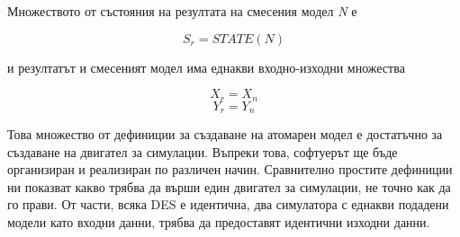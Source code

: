 		\noindent Множеството от състояния на резултата на смесения модел \emph{N} е
		
		\begin{equation}
			S_r = STATE(N)
		\end{equation}
		
		\noindent и резултатът и смесеният модел има еднакви входно-изходни множества
		
		\begin{equation}
			X_r = X_n
		\end{equation}		
		\begin{equation}
			Y_r = Y_n
		\end{equation}
		
		Това множество от дефиниции за създаване на атомарен модел е достатъчно
		за създаване на двигател за симулации. Въпреки това, софтуерът ще бъде
		организиран и реализиран по различен начин. Сравнително простите
		дефиниции ни показват какво трябва да върши един двигател за симулации,
		не точно как да го прави. От части, всяка \ac{DES} е идентична, два
		симулатора с еднакви подадени модели като входни данни, трябва да
		предоставят идентични изходни данни.